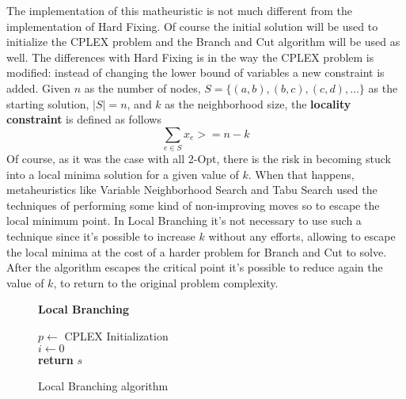 The implementation of this matheuristic is not much different from the implementation of Hard Fixing.
Of course the initial solution will be used to initialize the CPLEX problem and the Branch and Cut algorithm will be used as well.
The differences with Hard Fixing is in the way the CPLEX problem is modified: instead of changing the lower bound of variables a new constraint is added.
Given $n$ as the number of nodes, $S = \{(a,b),(b,c),(c,d),...\}$ as the starting solution, $|S| = n$, and $k$ as the neighborhood size, the \textbf{locality constraint} is defined as follows
\[
    \sum_{e \in S} x_e >= n-k
\]
Of course, as it was the case with all 2-Opt, there is the risk in becoming stuck into a local minima solution for a given value of $k$.
When that happens, metaheuristics like Variable Neighborhood Search and Tabu Search used the techniques of performing some kind of non-improving moves so to escape the local minimum point.
In Local Branching it's not necessary to use such a technique since it's possible to increase $k$ without any efforts, allowing to escape the local minima at the cost of a harder problem for Branch and Cut to solve.
After the algorithm escapes the critical point it's possible to reduce again the value of $k$, to return to the original problem complexity.

\begin{figure}[htbp]
	\textbf{Local Branching} \\
	\begin{algorithm}[H]
		\vspace{2mm}
        $p \gets$ CPLEX Initialization \\
        $i \gets 0$ \\ 
        \textbf{return} $s$
	\end{algorithm}
	\caption{Local Branching algorithm} \label{fig:localBranching}
\end{figure}

